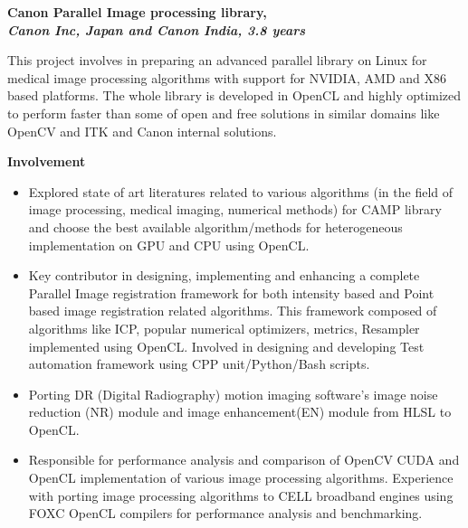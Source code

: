 \documentclass[a4paper,10pt]{memoir} %
\newcommand{\SmallSep}{\vspace{0.5em}} %
\newcommand{\CVItem}[2]{ %
\textbf{\color{RoyalBlue} #1}\par
#2
\SmallSep %
}
\begin{document}
\CVItem{Canon Parallel Image processing library, \\
\textit{Canon Inc, Japan and Canon India, 3.8 years}} {
This project involves in preparing an advanced parallel library on Linux for medical image processing algorithms with support for NVIDIA, AMD and X86 based platforms.  The whole library is developed in OpenCL and highly optimized to perform faster than some of open and free solutions in similar domains like OpenCV and ITK and Canon internal solutions. 

\textbf{Involvement}
\begin{itemize}
\item Explored state of art literatures related to various algorithms (in the field of image processing, medical imaging, numerical methods) for CAMP library and choose the best available algorithm/methods for heterogeneous implementation on GPU and CPU using OpenCL.
\item Key contributor in designing, implementing and enhancing a complete Parallel Image registration framework for both intensity based and Point based image registration related algorithms. This framework composed of algorithms like ICP, popular numerical optimizers, metrics, Resampler implemented using OpenCL.  Involved in designing and developing Test automation framework using CPP unit/Python/Bash scripts. 
\item Porting DR (Digital Radiography) motion imaging software's image noise reduction (NR) module and image enhancement(EN) module from HLSL to OpenCL. 
\item Responsible for performance analysis and comparison of OpenCV CUDA and OpenCL implementation of various image processing algorithms. Experience with porting image processing algorithms to CELL broadband engines using FOXC OpenCL compilers for performance analysis and benchmarking. 
\end{itemize}
\hrulefill
}
\end{document}
